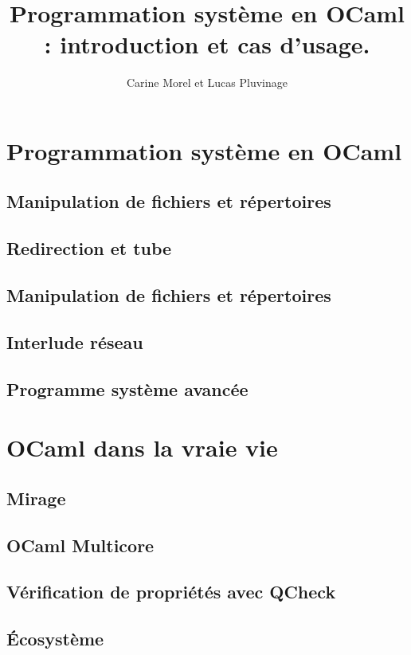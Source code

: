 \documentclass[xcolor=x11names]{beamer}
\title[Programmation système en OCaml]{Programmation système en OCaml : introduction et cas d'usage.}
\author[Carine et Lucas]{Carine Morel et Lucas Pluvinage}
\institute{Tarides}
\begin{document}
\maketitle


\section{Programmation système en OCaml}


\subsection{Manipulation de fichiers et répertoires}



\subsection{Redirection et tube}


\subsection{Manipulation de fichiers et répertoires}


\subsection{Interlude réseau}


\subsection{Programme système avancée}


\section{OCaml dans la vraie vie}

\subsection{Mirage}

\subsection{OCaml Multicore}

\subsection{Vérification de propriétés avec QCheck}

\subsection{Écosystème}

\end{document}
